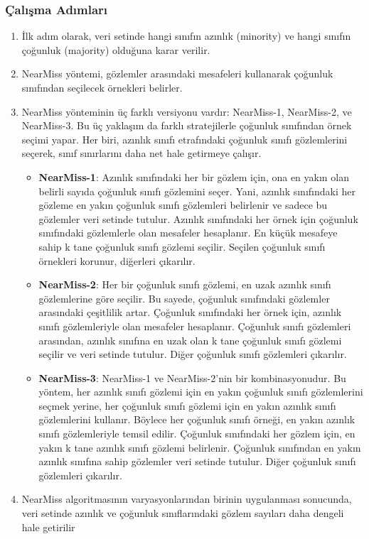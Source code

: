 \subsubsection{Çalışma Adımları}

\begin{enumerate}
    \item İlk adım olarak, veri setinde hangi sınıfın azınlık (minority) ve hangi sınıfın çoğunluk (majority) olduğuna karar verilir.
    \item NearMiss yöntemi, gözlemler arasındaki mesafeleri kullanarak çoğunluk sınıfından seçilecek örnekleri belirler.
    \item NearMiss yönteminin üç farklı versiyonu vardır: NearMiss-1, NearMiss-2, ve NearMiss-3. Bu üç yaklaşım da farklı stratejilerle çoğunluk sınıfından örnek seçimi yapar. Her biri, azınlık sınıfı etrafındaki çoğunluk sınıfı gözlemlerini seçerek, sınıf sınırlarını daha net hale getirmeye çalışır.
    \begin{itemize}
        \item \textbf{NearMiss-1}: Azınlık sınıfındaki her bir gözlem için, ona en yakın olan belirli sayıda çoğunluk sınıfı gözlemini seçer. Yani, azınlık sınıfındaki her gözleme en yakın çoğunluk sınıfı gözlemleri belirlenir ve sadece bu gözlemler veri setinde tutulur. Azınlık sınıfındaki her örnek için çoğunluk sınıfındaki gözlemlerle olan mesafeler hesaplanır. En küçük mesafeye sahip k tane çoğunluk sınıfı gözlemi seçilir. Seçilen çoğunluk sınıfı örnekleri korunur, diğerleri çıkarılır.
        \item \textbf{NearMiss-2}: Her bir çoğunluk sınıfı gözlemi, en uzak azınlık sınıfı gözlemlerine göre seçilir. Bu sayede, çoğunluk sınıfındaki gözlemler arasındaki çeşitlilik artar. Çoğunluk sınıfındaki her örnek için, azınlık sınıfı gözlemleriyle olan mesafeler hesaplanır. Çoğunluk sınıfı gözlemleri arasından, azınlık sınıfına en uzak olan k tane çoğunluk sınıfı gözlemi seçilir ve veri setinde tutulur. Diğer çoğunluk sınıfı gözlemleri çıkarılır.
        \item \textbf{NearMiss-3}: NearMiss-1 ve NearMiss-2'nin bir kombinasyonudur. Bu yöntem, her azınlık sınıfı gözlemi için en yakın çoğunluk sınıfı gözlemlerini seçmek yerine, her çoğunluk sınıfı gözlemi için en yakın azınlık sınıfı gözlemlerini kullanır. Böylece her çoğunluk sınıfı örneği, en yakın azınlık sınıfı gözlemleriyle temsil edilir. Çoğunluk sınıfındaki her gözlem için, en yakın k tane azınlık sınıfı gözlemi belirlenir. Çoğunluk sınıfından en yakın azınlık sınıfına sahip gözlemler veri setinde tutulur. Diğer çoğunluk sınıfı gözlemleri çıkarılır.
    \end{itemize}
    \item NearMiss algoritmasının varyasyonlarından birinin uygulanması sonucunda, veri setinde azınlık ve çoğunluk sınıflarındaki gözlem sayıları daha dengeli hale getirilir
\end{enumerate}

